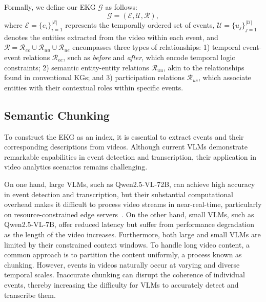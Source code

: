Formally, we define our EKG $\mathcal{G}$ as follows: 
\begin{equation}
    \mathcal{G} = (\mathcal{E}, \mathcal{U}, \mathcal{R}),
\end{equation}
where $\mathcal{E} = \{e_i\}_{i=1}^{|\mathcal{E}|}$ represents the temporally ordered set of events, $\mathcal{U} = \{u_j\}_{j=1}^{|\mathcal{U}|}$ denotes the entities extracted from the video within each event, and $\mathcal{R} = \mathcal{R}_{ee} \cup \mathcal{R}_{uu} \cup \mathcal{R}_{ue}$ encompasses three types of relationships: 1) temporal event-event relations $\mathcal{R}_{ee}$, such as \emph{before} and \emph{after}, which encode temporal logic constraints; 2) semantic entity-entity relations $\mathcal{R}_{uu}$, akin to the relationships found in conventional KGs; and 3) participation relations $\mathcal{R}_{ue}$, which associate entities with their contextual roles within specific events.




\subsection{Semantic Chunking}
\label{subsec: sematic_chunking}






    
    




To construct the EKG as an index, it is essential to extract events and their corresponding descriptions from videos. Although current VLMs demonstrate remarkable capabilities in event detection and transcription, their application in video analytics scenarios remains challenging.

On one hand, large VLMs, such as Qwen2.5-VL-72B, can achieve high accuracy in event detection and transcription, but their substantial computational overhead makes it difficult to process video streams in near-real-time, particularly on resource-constrained edge servers~\cite{10.1145/3719664}. On the other hand, small VLMs, such as Qwen2.5-VL-7B, offer reduced latency but suffer from performance degradation as the length of the video increases. Furthermore, both large and small VLMs are limited by their constrained context windows. To handle long video content, a common approach is to partition the content uniformly, a process known as chunking. However, events in videos naturally occur at varying and diverse temporal scales. Inaccurate chunking can disrupt the coherence of individual events, thereby increasing the difficulty for VLMs to accurately detect and transcribe them.


